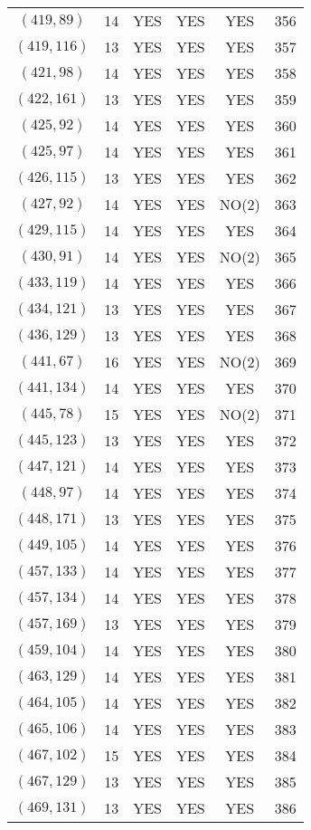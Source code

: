 \begin{longtable}{|c|c|c|c|c|c|}
$(419, 89)$ & 14 & YES & YES & YES & 356\\
$(419, 116)$ & 13 & YES & YES & YES & 357\\
$(421, 98)$ & 14 & YES & YES & YES & 358\\
$(422, 161)$ & 13 & YES & YES & YES & 359\\
$(425, 92)$ & 14 & YES & YES & YES & 360\\
$(425, 97)$ & 14 & YES & YES & YES & 361\\
$(426, 115)$ & 13 & YES & YES & YES & 362\\
$(427, 92)$ & 14 & YES & YES & NO(2) & 363\\
$(429, 115)$ & 14 & YES & YES & YES & 364\\
$(430, 91)$ & 14 & YES & YES & NO(2) & 365\\
$(433, 119)$ & 14 & YES & YES & YES & 366\\
$(434, 121)$ & 13 & YES & YES & YES & 367\\
$(436, 129)$ & 13 & YES & YES & YES & 368\\
$(441, 67)$ & 16 & YES & YES & NO(2) & 369\\
$(441, 134)$ & 14 & YES & YES & YES & 370\\
$(445, 78)$ & 15 & YES & YES & NO(2) & 371\\
$(445, 123)$ & 13 & YES & YES & YES & 372\\
$(447, 121)$ & 14 & YES & YES & YES & 373\\
$(448, 97)$ & 14 & YES & YES & YES & 374\\
$(448, 171)$ & 13 & YES & YES & YES & 375\\
$(449, 105)$ & 14 & YES & YES & YES & 376\\
$(457, 133)$ & 14 & YES & YES & YES & 377\\
$(457, 134)$ & 14 & YES & YES & YES & 378\\
$(457, 169)$ & 13 & YES & YES & YES & 379\\
$(459, 104)$ & 14 & YES & YES & YES & 380\\
$(463, 129)$ & 14 & YES & YES & YES & 381\\
$(464, 105)$ & 14 & YES & YES & YES & 382\\
$(465, 106)$ & 14 & YES & YES & YES & 383\\
$(467, 102)$ & 15 & YES & YES & YES & 384\\
$(467, 129)$ & 13 & YES & YES & YES & 385\\
$(469, 131)$ & 13 & YES & YES & YES & 386\\

\end{longtable}
